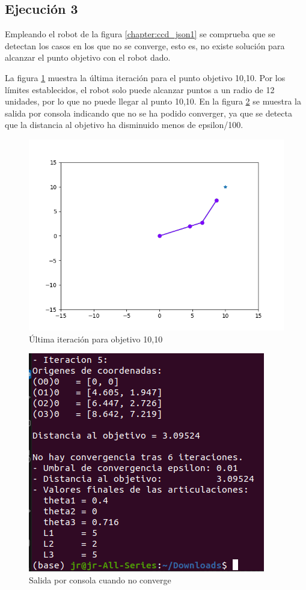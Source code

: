 \subsection{Ejecución 3}
Empleando el robot de la figura \ref{chapter:ccd_json1} se comprueba que se detectan los casos en los que no se converge, esto es, no existe solución para alcanzar el punto objetivo con el robot dado.

La figura \ref{chapter:ccd_ejemplo5} muestra la última iteración para el punto objetivo 10,10. Por los límites establecidos, el robot solo puede alcanzar puntos a un radio de 12 unidades, por lo que no puede llegar al punto 10,10.
En la figura \ref{chapter:ccd_ejemplo6} se muestra la salida por consola indicando que no se ha podido converger, ya que se detecta que la distancia al objetivo ha disminuido menos de epsilon/100.
\begin{figure}[htb]
   \centering
   \includegraphics[width=.8\linewidth]{images/ccd_10.png}
   \caption{Última iteración para objetivo 10,10}
   \label{chapter:ccd_ejemplo5}
\end{figure}
\begin{figure}[htb]
   \centering
   \includegraphics[width=.6\linewidth]{images/ccd_11.png}
   \caption{Salida por consola cuando no converge}
   \label{chapter:ccd_ejemplo6}
\end{figure}

